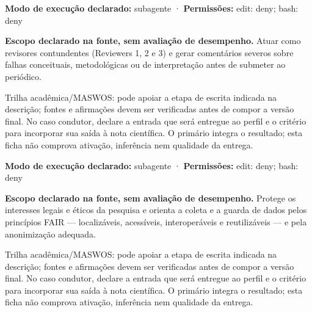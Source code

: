 \begin{arquitetura}
\textbf{Modo de execução declarado:} subagente · \textbf{Permissões:} edit: deny; bash: deny
\end{arquitetura}


\begin{descricao}
\textbf{Escopo declarado na fonte, sem avaliação de desempenho.}
Atuar como revisores contundentes (Reviewers 1, 2 e 3) e gerar comentários severos sobre falhas conceituais, metodológicas ou de interpretação antes de submeter ao periódico.
\end{descricao}

\begin{funcao}
Trilha acadêmica/MASWOS: pode apoiar a etapa de escrita indicada na descrição; fontes e afirmações devem ser verificadas antes de compor a versão final. No caso condutor, declare a entrada que será entregue ao perfil e o critério para incorporar sua saída à nota científica. O primário integra o resultado; esta ficha não comprova ativação, inferência nem qualidade da entrega.
\end{funcao}

\begin{arquitetura}
\textbf{Modo de execução declarado:} subagente · \textbf{Permissões:} edit: deny; bash: deny
\end{arquitetura}


\begin{descricao}
\textbf{Escopo declarado na fonte, sem avaliação de desempenho.}
Protege os interesses legais e éticos da pesquisa e orienta a coleta e a guarda de dados pelos princípios FAIR — localizáveis, acessíveis, interoperáveis e reutilizáveis — e pela anonimização adequada.
\end{descricao}

\begin{funcao}
Trilha acadêmica/MASWOS: pode apoiar a etapa de escrita indicada na descrição; fontes e afirmações devem ser verificadas antes de compor a versão final. No caso condutor, declare a entrada que será entregue ao perfil e o critério para incorporar sua saída à nota científica. O primário integra o resultado; esta ficha não comprova ativação, inferência nem qualidade da entrega.
\end{funcao}

